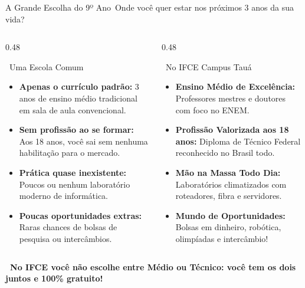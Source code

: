 \begin{frame}{A Grande Escolha do 9º Ano}{\faQuestionCircle\ Onde você quer estar nos próximos 3 anos da sua vida?}
  \begin{columns}[t]
    \begin{column}{0.48\textwidth}
      \begin{moderncard}{\faSchool\ Uma Escola Comum}
        \scriptsize
        \begin{itemize}\setlength{\itemsep}{0.18em}
          \item \textbf{Apenas o currículo padrão:} 3 anos de ensino médio tradicional em sala de aula convencional.
          \item \textbf{Sem profissão ao se formar:} Aos 18 anos, você sai sem nenhuma habilitação para o mercado.
          \item \textbf{Prática quase inexistente:} Poucos ou nenhum laboratório moderno de informática.
          \item \textbf{Poucas oportunidades extras:} Raras chances de bolsas de pesquisa ou intercâmbios.
        \end{itemize}
      \end{moderncard}
    \end{column}
    
    \begin{column}{0.48\textwidth}
      \begin{greencard}{\faRocket\ No IFCE Campus Tauá}
        \scriptsize
        \begin{itemize}\setlength{\itemsep}{0.18em}
          \item \textbf{Ensino Médio de Excelência:} Professores mestres e doutores com foco no ENEM.
          \item \textbf{Profissão Valorizada aos 18 anos:} Diploma de Técnico Federal reconhecido no Brasil todo.
          \item \textbf{Mão na Massa Todo Dia:} Laboratórios climatizados com roteadores, fibra e servidores.
          \item \textbf{Mundo de Oportunidades:} Bolsas em dinheiro, robótica, olimpíadas e intercâmbio!
        \end{itemize}
      \end{greencard}
    \end{column}
  \end{columns}
  
  \vspace{0.1cm}
  \begin{center}
    \scriptsize \textcolor{IFCERed}{\textbf{\faLightbulb\ No IFCE você não escolhe entre Médio ou Técnico: você tem os dois juntos e 100\% gratuito!}}
  \end{center}
\end{frame}


